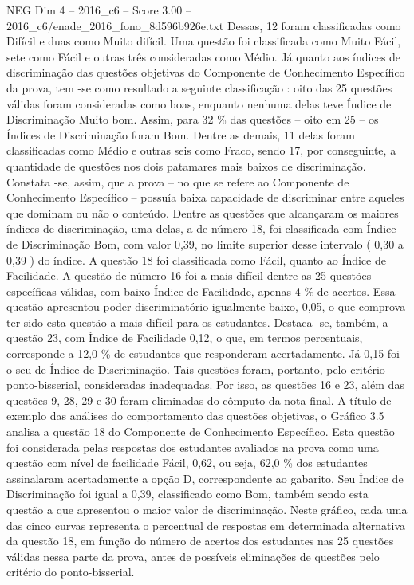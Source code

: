 \begin{textsample}{NEG Dim 4 – 2016\_c6 – Score 3.00 – 2016\_c6/enade\_2016\_fono\_8d596b926e.txt}
Dessas, 12 foram classificadas como Difícil e duas como Muito difícil.
Uma questão foi classificada como Muito Fácil, sete como Fácil e outras três consideradas como Médio.
Já quanto aos índices de discriminação das questões objetivas do Componente de Conhecimento Específico da prova, tem -se como resultado a seguinte classificação : oito das 25 questões válidas foram consideradas como boas, enquanto nenhuma delas teve Índice de Discriminação Muito bom.
Assim, para 32 \% das questões – oito em 25 – os Índices de Discriminação foram Bom.
Dentre as demais, 11 delas foram classificadas como Médio e outras seis como Fraco, sendo 17, por conseguinte, a quantidade de questões nos dois patamares mais baixos de discriminação.
Constata -se, assim, que a prova – no que se refere ao Componente de Conhecimento Específico – possuía baixa capacidade de discriminar entre aqueles que dominam ou não o conteúdo.
Dentre as questões que alcançaram os maiores índices de discriminação, uma delas, a de número 18, foi classificada com Índice de Discriminação Bom, com valor 0,39, no limite superior desse intervalo ( 0,30 a 0,39 ) do índice.
A questão 18 foi classificada como Fácil, quanto ao Índice de Facilidade.
A questão de número 16 foi a mais difícil dentre as 25 questões específicas válidas, com baixo Índice de Facilidade, apenas 4 \% de acertos.
Essa questão apresentou poder discriminatório igualmente baixo, 0,05, o que comprova ter sido esta questão a mais difícil para os estudantes.
Destaca -se, também, a questão 23, com Índice de Facilidade 0,12, o que, em termos percentuais, corresponde a 12,0 \% de estudantes que responderam acertadamente.
Já 0,15 foi o seu de Índice de Discriminação.
Tais questões foram, portanto, pelo critério ponto-bisserial, consideradas inadequadas.
Por isso, as questões 16 e 23, além das questões 9, 28, 29 e 30 foram eliminadas do cômputo da nota final.
A título de exemplo das análises do comportamento das questões objetivas, o Gráfico 3.5 analisa a questão 18 do Componente de Conhecimento Específico.
Esta questão foi considerada pelas respostas dos estudantes avaliados na prova como uma questão com nível de facilidade Fácil, 0,62, ou seja, 62,0 \% dos estudantes assinalaram acertadamente a opção D, correspondente ao gabarito.
Seu Índice de Discriminação foi igual a 0,39, classificado como Bom, também sendo esta questão a que apresentou o maior valor de discriminação.
Neste gráfico, cada uma das cinco curvas representa o percentual de respostas em determinada alternativa da questão 18, em função do número de acertos dos estudantes nas 25 questões válidas nessa parte da prova, antes de possíveis eliminações de questões pelo critério do ponto-bisserial.

\end{textsample}
